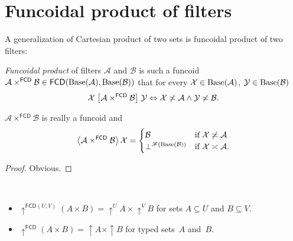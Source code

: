\section{Funcoidal product of filters}

A generalization of Cartesian product of two sets is funcoidal product
of two filters:
\begin{defn}
\emph{Funcoidal product} of filters $\mathcal{A}$
and $\mathcal{B}$ is such a funcoid
$\mathcal{A}\times^{\mathsf{FCD}}\mathcal{B}\in\mathsf{FCD}(\operatorname{Base}(\mathcal{A}
),\operatorname{Base}(\mathcal{B}))$
that for every $\mathcal{X}\in\operatorname{Base}(\mathcal{A})$,
$\mathcal{Y}\in\operatorname{Base}(\mathcal{B})$
\[
\mathcal{X}\mathrel{\left[\mathcal{A}\times^{\mathsf{FCD}}\mathcal{B}\right]}\mathcal{Y}
\Leftrightarrow\mathcal{X}\not\asymp\mathcal{A}\land\mathcal{Y}\not\asymp\mathcal{B}.
\]
\end{defn}
\begin{prop}
$\mathcal{A}\times^{\mathsf{FCD}}\mathcal{B}$ is really a funcoid
and
\[
\left\langle \mathcal{A}\times^{\mathsf{FCD}}\mathcal{B}\right\rangle\mathcal{X}=\begin{cases}
\mathcal{B} & \text{if }\mathcal{X}\not\asymp\mathcal{A}\\
\bot^{\mathscr{F}(\operatorname{Base}(\mathcal{B}))} & \text{if }\mathcal{X}\asymp\mathcal{A}.
\end{cases}
\]
\end{prop}
\begin{proof}
Obvious.\end{proof}
\begin{obvious}
~
\begin{itemize}
\item $\uparrow^{\mathsf{FCD}(U,V)}(A\times B)=\uparrow^{U}A\times\uparrow^{V}B$
for sets $A\subseteq U$ and $B\subseteq V$.
\item $\uparrow^{\mathsf{FCD}}(A\times B)=\uparrow A\times\uparrow B$ for
typed sets~$A$ and~$B$.
\end{itemize}
\end{obvious}

